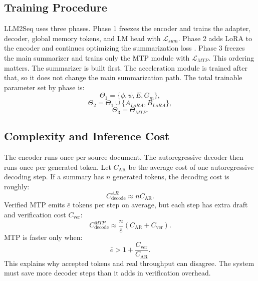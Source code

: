 \documentclass[11pt]{article}
\begin{document}
\subsection{Training Procedure}

LLM2Seq uses three phases.
Phase 1 freezes the encoder and trains the adapter, decoder, global memory tokens, and LM head with $\mathcal{L}_{sum}$.
Phase 2 adds LoRA to the encoder and continues optimizing the summarization loss \citep{hu2022lora}.
Phase 3 freezes the main summarizer and trains only the MTP module with $\mathcal{L}_{MTP}$.
This ordering matters.
The summarizer is built first.
The acceleration module is trained after that, so it does not change the main summarization path.
The total trainable parameter set by phase is:
\begin{equation}
\Theta_1=\{\phi,\psi,E,G_m\},
\end{equation}
\begin{equation}
\Theta_2=\Theta_1\cup\{A_{LoRA},B_{LoRA}\},
\end{equation}
\begin{equation}
\Theta_3=\Theta_{MTP}.
\end{equation}

\subsection{Complexity and Inference Cost}

The encoder runs once per source document.
The autoregressive decoder then runs once per generated token.
Let $C_{\mathrm{AR}}$ be the average cost of one autoregressive decoding step.
If a summary has $n$ generated tokens, the decoding cost is roughly:
\begin{equation}
C_{\mathrm{decode}}^{AR}\approx nC_{\mathrm{AR}}.
\end{equation}
Verified MTP emits $\bar{e}$ tokens per step on average, but each step has extra draft and verification cost $C_{\mathrm{ver}}$:
\begin{equation}
C_{\mathrm{decode}}^{MTP}
\approx \frac{n}{\bar{e}}(C_{\mathrm{AR}}+C_{\mathrm{ver}}).
\end{equation}
MTP is faster only when:
\begin{equation}
\bar{e} > 1+\frac{C_{\mathrm{ver}}}{C_{\mathrm{AR}}}.
\end{equation}
This explains why accepted tokens and real throughput can disagree.
The system must save more decoder steps than it adds in verification overhead.
\end{document}
